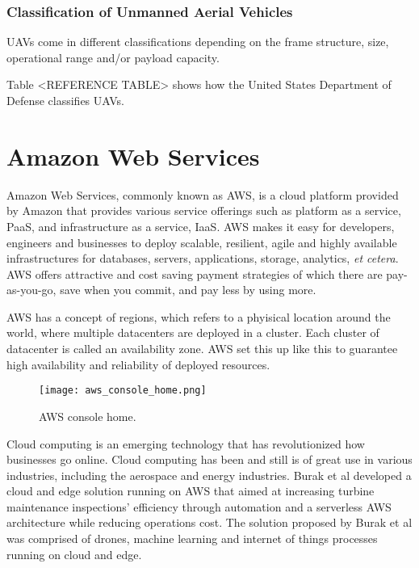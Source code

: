 \subsubsection{Classification of Unmanned Aerial Vehicles}
UAVs come in different classifications depending on the frame structure, size, operational range and/or payload capacity.

Table <REFERENCE TABLE> shows how the United States Department of Defense classifies UAVs.


\section{Amazon Web Services}
Amazon Web Services, commonly known as AWS, is a cloud platform provided by Amazon that provides various service offerings such as platform as a service, PaaS, and infrastructure as a service, IaaS\cite{awswhatisaws2022}. AWS makes it easy for developers, engineers and businesses to deploy scalable, resilient, agile and highly available infrastructures for databases, servers, applications, storage, analytics, \textit{et cetera}. AWS offers attractive and cost saving payment strategies of which there are pay-as-you-go, save when you commit, and pay less by using more\cite{awspricing2022}.

AWS has a concept of regions, which refers to a phyisical location around the world, where multiple datacenters are deployed in a cluster. Each cluster of datacenter is called an availability zone\cite{awsregionsandazs}. AWS set this up like this to guarantee high availability and reliability of deployed resources.

\begin{figure}[H]
    \centering \texttt{[image: aws\_console\_home.png]}
    \caption{AWS console home.}
    \label{fig:aws-console-home}
\end{figure}

Cloud computing is an emerging technology that has revolutionized how businesses go online. Cloud computing has been and still is of great use in various industries, including the aerospace and energy industries. Burak et al developed a cloud and edge solution running on AWS that aimed at increasing turbine maintenance inspections' efficiency through automation and a serverless AWS architecture while reducing operations cost\cite{burakawswindfarm2021}. The solution proposed by Burak et al was comprised of drones, machine learning and internet of things processes running on cloud and edge.

